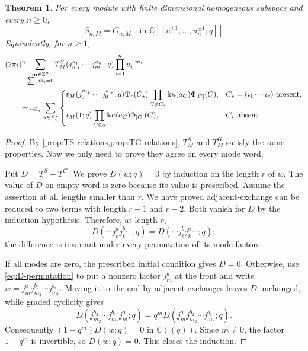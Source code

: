 \documentclass[11pt,a4paper]{amsart}
\numberwithin{equation}{section}
\newtheorem{theorem}{Theorem}[section]
\theoremstyle{definition}
\theoremstyle{remark}
\newcommand{\CC}{\mathbb C}
\newcommand{\ZZ}{\mathbb Z}
\newcommand{\kk}{\Bbbk}
\newcommand{\ii}{i}
\newcommand{\cP}{\mathcal P}
\newcommand{\scrD}{\mathscr D}
\newcommand{\mbf}{\boldsymbol m}
\begin{document}
\begin{theorem}
\label{thm:formal-cycle}
For every module with finite dimensional homogeneous subspace and every $n\geq0$,
\begin{equation}
S_{n,M}=G_{n,M}\quad\text{in }
 \CC[[u_1^{\pm1},\ldots,u_n^{\pm1};q]]
 \label{eq:formal-cycle-equality}
\end{equation}
Equivalently, for $n\geq1$,
\begin{align}
 &(2\pi\ii)^n
 \sum_{\substack{\mbf\in\ZZ^n\\\sum_i m_i=0}}
 T^S_M(j_{m_1}^{a_1}\cdots j_{m_n}^{a_n};q)
 \prod_{i=1}^n u_i^{-m_i}\notag\\
 &\qquad=\iota_{\scrD_n}
 \sum_{\alpha\in\cP_n^\star}
 \begin{cases}
 \displaystyle
 t_M(j_0^{a_{i_1}}\cdots j_0^{a_{i_r}};q)
 \Psi_r(C_\star)
 \prod_{C\neq C_\star}\kk\kappa(a_C)\Phi_{|C|}(C),
 &C_\star=(i_1\cdots i_r)\text{ present},\\[3ex]
 \displaystyle
 t_M(1;q)\prod_{C\in\alpha}\kk\kappa(a_C)\Phi_{|C|}(C),
 &C_\star\text{ absent}.
 \end{cases}
 \label{eq:formal-cycle-expanded}
\end{align}
\end{theorem}

\begin{proof}
By \cref{prop:TS-relations,prop:TG-relations}, $T^S_M$ and $T^G_M$
satisfy the same properties. Now we only need to prove they agree on every mode word.

Put $D=T^S-T^G$.  We prove
$D(w;q)=0$ by induction on the length $r$ of $w$.  The value of $D$ on empty word is zero because its value is prescribed.  Assume the assertion at all lengths smaller than $r$.  We have proved adjacent-exchange can be reduced to two terms with length $r-1$ and $r-2$. Both vanish for $D$ by the induction hypothesis.  Therefore, at length $r$,
\begin{equation}
 D(\cdots j_k^a j_\ell^b\cdots;q)
 =D(\cdots j_\ell^b j_k^a\cdots;q);
 \label{eq:D-permutation}
\end{equation}
the difference is invariant under every permutation of its mode factors.

If all modes are zero, the prescribed initial condition gives $D=0$.
Otherwise, use \eqref{eq:D-permutation} to put a nonzero factor
$j_m^a$ at the front and write $w=j_m^a j_{m_2}^{b_2}\cdots j_{m_r}^{b_r}$.  Moving it to the end by
adjacent exchanges leaves $D$ unchanged, while graded cyclicity gives
\begin{equation*}
 D(j_{m_2}^{b_2}\cdots j_{m_r}^{b_r}j_m^a;q)
 =q^mD(j_m^a j_{m_2}^{b_2}\cdots j_{m_r}^{b_r};q).
\end{equation*}
Consequently $(1-q^m)D(w;q)=0$ in $\CC((q))$.  Since $m\neq0$, the
factor $1-q^m$ is invertible, so $D(w;q)=0$.  This closes the induction.
\end{proof}
\end{document}
